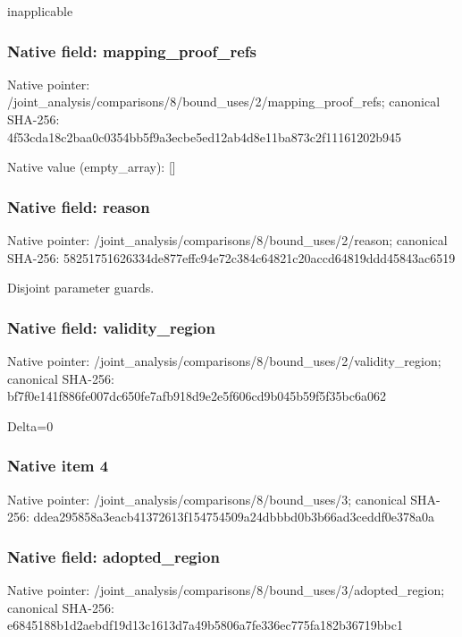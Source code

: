 \documentclass[10pt,a4paper]{article}
\begin{document}
\begingroup\raggedright\sloppy inapplicable\par\endgroup

\subsubsection{Native field: mapping\_\allowbreak{}proof\_\allowbreak{}refs}
Native pointer: /joint\_\allowbreak{}analysis/comparisons/8/bound\_\allowbreak{}uses/2/mapping\_\allowbreak{}proof\_\allowbreak{}refs; canonical SHA-256: 4f53cda18c2baa0c0354bb5f9a3ecbe5ed12ab4d8e11ba873c2f11161202b945

Native value (empty\_\allowbreak{}array): []

\subsubsection{Native field: reason}
Native pointer: /joint\_\allowbreak{}analysis/comparisons/8/bound\_\allowbreak{}uses/2/reason; canonical SHA-256: 58251751626334de877effc94e72c384c64821c20accd64819ddd45843ac6519

\begingroup\raggedright\sloppy Disjoint parameter guards.\par\endgroup

\subsubsection{Native field: validity\_\allowbreak{}region}
Native pointer: /joint\_\allowbreak{}analysis/comparisons/8/bound\_\allowbreak{}uses/2/validity\_\allowbreak{}region; canonical SHA-256: bf7f0e141f886fe007dc650fe7afb918d9e2e5f606cd9b045b59f5f35bc6a062

\begingroup\raggedright\sloppy Delta=\allowbreak{}0\par\endgroup

\subsubsection{Native item 4}
Native pointer: /joint\_\allowbreak{}analysis/comparisons/8/bound\_\allowbreak{}uses/3; canonical SHA-256: ddea295858a3eacb41372613f154754509a24dbbbd0b3b66ad3ceddf0e378a0a

\subsubsection{Native field: adopted\_\allowbreak{}region}
Native pointer: /joint\_\allowbreak{}analysis/comparisons/8/bound\_\allowbreak{}uses/3/adopted\_\allowbreak{}region; canonical SHA-256: e6845188b1d2aebdf19d13c1613d7a49b5806a7fe336ec775fa182b36719bbc1
\end{document}
